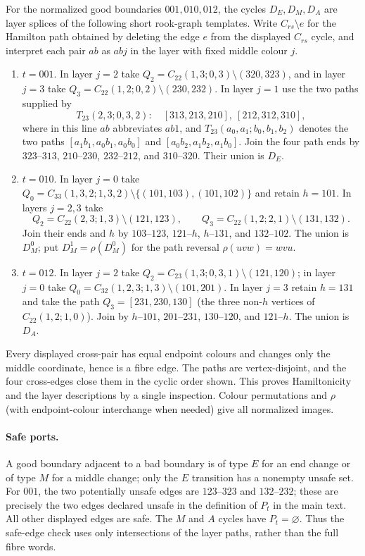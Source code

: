 \begin{lemma}\label{lem:structural-good-cycles}
For the normalized good boundaries $001,010,012$, the cycles $D_E,D_M,D_A$
are layer splices of the following short rook-graph templates.  Write
$C_{rs}\setminus e$ for the Hamilton path obtained by deleting the edge
$e$ from the displayed $C_{rs}$ cycle, and interpret each pair $ab$ as
$abj$ in the layer with fixed middle colour $j$.
\begin{enumerate}
\item $t=001$.  In layer $j=2$ take
$Q_2=C_{22}(1,3;0,3)\setminus(320,323)$, and in layer $j=3$ take
$Q_3=C_{22}(1,2;0,2)\setminus(230,232)$.  In layer $j=1$ use the two
paths supplied by
\[
 T_{23}(2,3;0,3,2):\quad
 [313,213,210],\ [212,312,310],
\]
where in this line $ab$ abbreviates $ab1$, and $T_{23}(a_0,a_1;b_0,b_1,b_2)$ denotes the two paths
$[a_1b_1,a_0b_1,a_0b_0]$ and
$[a_0b_2,a_1b_2,a_1b_0]$.  Join the four path ends by
$323\!\text{--}313$, $210\!\text{--}230$, $232\!\text{--}212$,
and $310\!\text{--}320$.  Their union is $D_E$.
\item $t=010$.  In layer $j=0$ take
$Q_0=C_{33}(1,3,2;1,3,2)\setminus\{(101,103),(101,102)\}$ and retain
$h=101$.  In layers $j=2,3$ take
\[
 Q_2=C_{22}(2,3;1,3)\setminus(121,123),\qquad
 Q_3=C_{22}(1,2;2,1)\setminus(131,132).
\]
Join their ends and $h$ by
$103\!\text{--}123$, $121\!\text{--}h$, $h\!\text{--}131$,
and $132\!\text{--}102$.  The union is $D_M^0$; put
$D_M^1=\rho(D_M^0)$ for the path reversal $\rho(uvw)=wvu$.
\item $t=012$.  In layer $j=2$ take
$Q_2=C_{23}(1,3;0,3,1)\setminus(121,120)$; in layer $j=0$ take
$Q_0=C_{32}(1,2,3;1,3)\setminus(101,201)$.  In layer $j=3$ retain
$h=131$ and take the path
$Q_3=[231,230,130]$ (the three non-$h$ vertices of
$C_{22}(1,2;1,0)$).  Join by
$h\!\text{--}101$, $201\!\text{--}231$,
$130\!\text{--}120$, and $121\!\text{--}h$.  The union is $D_A$.
\end{enumerate}
Every displayed cross-pair has equal endpoint colours and changes only the
middle coordinate, hence is a fibre edge.  The paths are vertex-disjoint,
and the four cross-edges close them in the cyclic order shown.  This proves
Hamiltonicity and the layer descriptions by a single inspection.  Colour
permutations and $\rho$ (with endpoint-colour interchange when needed) give
all normalized images.
\end{lemma}

\paragraph{Safe ports.}
A good boundary adjacent to a bad boundary is of type $E$ for an end change or of type $M$ for a middle change; only the $E$ transition has a nonempty unsafe set.  For
$001$, the two potentially unsafe edges are
$123\!\text{--}\!323$ and $132\!\text{--}\!232$; these are precisely the two edges declared unsafe in the definition of
$P_t$ in the main text.  All other displayed edges are safe.  The $M$ and $A$ cycles have
$P_t=\varnothing$.  Thus the safe-edge check uses only intersections of
the layer paths, rather than the full fibre words.

